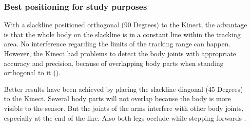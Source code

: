 
\subsubsection{Best positioning for study purposes}

With a slackline positioned orthogonal (90 Degrees) to the Kinect, the advantage is that the whole body on the slackline is in a constant line within the tracking area. No interference regarding the limits of the tracking range can happen. However, the Kinect had problems to detect the body joints with appropriate accuracy and precision, because of overlapping body parts when standing orthogonal to it (\textbf{}).

Better results have been achieved by placing the slackline diagonal (45 Degrees) to the Kinect. Several body parts will not overlap because the body is more visible to the sensor.
But the joints of the arms interfere with other body joints, especially at the end of the line. Also both legs occlude while stepping forwards \textbf{}. 

